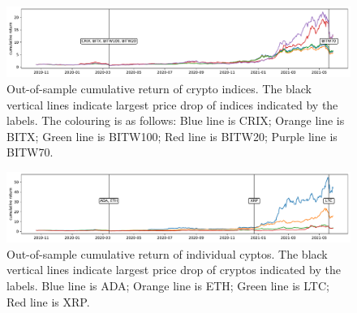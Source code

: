 
\begin{figure}[t]
\includegraphics[width=\textwidth]{_pics/index_price.pdf}
  \caption{Out-of-sample cumulative return of crypto indices.
  The black vertical lines indicate largest price drop of indices indicated by the labels.
  The colouring is as follows:
  \textcolor{plt1}{Blue line} is CRIX;
  \textcolor{plt2}{Orange line} is BITX;
  \textcolor{plt3}{Green line} is BITW100;
  \textcolor{plt4}{Red line} is BITW20;
  \textcolor{plt5}{Purple line} is BITW70.
  }
\label{fig:index_price}
\end{figure}

\begin{figure}[t]
\includegraphics[width=\textwidth]{_pics/individualCoins_price.pdf}
  \caption{Out-of-sample cumulative return of individual cyptos.
  The black vertical lines indicate largest price drop of cryptos indicated by the labels.
    \textcolor{plt1}{Blue line} is ADA;
  \textcolor{plt2}{Orange line} is ETH;
  \textcolor{plt3}{Green line} is LTC;
  \textcolor{plt4}{Red line} is XRP.}

\label{fig:individualCoins_price}
\end{figure}

